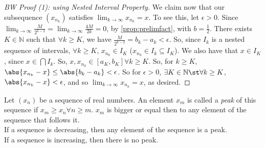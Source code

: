 \documentclass[12pt]{article}
\begin{document}
\begin{proof}[BW Proof (1): using Nested Interval Property]
  We claim now that our subsequence $(x_{n_k})$ satisfies $\lim_{k\to\infty} x_{n_k} = x$. To see this, let $\epsilon > 0$. Since $\lim_{k\to\infty}\frac{M}{2^{k-2}} = \lim_{k\to\infty}\frac{4M}{2k} = 0$, by \cref{prop:prelimfact}, with $b = \frac{1}{2}$. There exists $K \in \mathbb{N}$ such that $\forall k \geq K$, we have $\frac{M}{2^{k-2}} = b_k - a_k < \epsilon$. So, since $I_k$ is a nested sequence of intervals, $\forall k \geq K$, $x_{n_k} \in I_K$ ($x_{n_k} \in I_k \subseteq I_K$). We also have that $x \in I_K$, since $x \in \bigcap I_k$. So, $x, x_{n_k} \in [a_K, b_K] \forall k \geq K$. So, for $k \geq K$, $\abs{x_{n_k} - x} \leq \abs{b_k - a_k} < \epsilon$. So for $\epsilon > 0$, $\exists K \in \mathbb{N} \st \forall k \geq K$, $\abs{x_{n_k}-x} < \epsilon$, and so $\lim_{k\to\infty} x_{n_k} = x$, as desired.
\end{proof}


\begin{definition}[Peak]
  Let $(x_n)$ be a sequence of real numbers.  An element $x_m$ is called a \emph{peak} of this sequence if $x_m \geq x_n \forall n \geq m$. $x_m$ is bigger or equal then to any element of the sequence that follows it.\\
  If a sequence is decreasing, then any element of the sequence is a peak.\\
  If a sequence is increasing, then there is no peak.
\end{definition}


\end{document}
